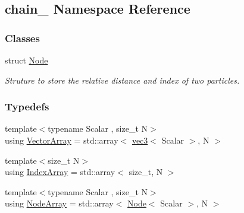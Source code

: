\hypertarget{namespacechain}{}\subsection{chain_ Namespace Reference}
\label{namespacechain}
\subsubsection*{Classes}
\begin{DoxyCompactItemize}
\item 
struct \mbox{\hyperlink{structchain_1_1_node}{Node}}
\begin{DoxyCompactList}\small\item\em Struture to store the relative distance and index of two particles. \end{DoxyCompactList}\end{DoxyCompactItemize}
\subsubsection*{Typedefs}
\begin{DoxyCompactItemize}
\item 
{\footnotesize template$<$typename Scalar , size\+\_\+t N$>$ }\\using \mbox{\hyperlink{namespacechain_aa715d2f046187ea9f0c3ea55605d6214}{Vector\+Array}} = std\+::array$<$ \mbox{\hyperlink{structvec3}{vec3}}$<$ Scalar $>$, N $>$
\item 
{\footnotesize template$<$size\+\_\+t N$>$ }\\using \mbox{\hyperlink{namespacechain_aa40d2da395c0ac2bc5f37832442ac403}{Index\+Array}} = std\+::array$<$ size\+\_\+t, N $>$
\item 
{\footnotesize template$<$typename Scalar , size\+\_\+t N$>$ }\\using \mbox{\hyperlink{namespacechain_a3a021b84403e03113e1dcd61ba304963}{Node\+Array}} = std\+::array$<$ \mbox{\hyperlink{structchain_1_1_node}{Node}}$<$ Scalar $>$, N $>$
\end{DoxyCompactItemize}
